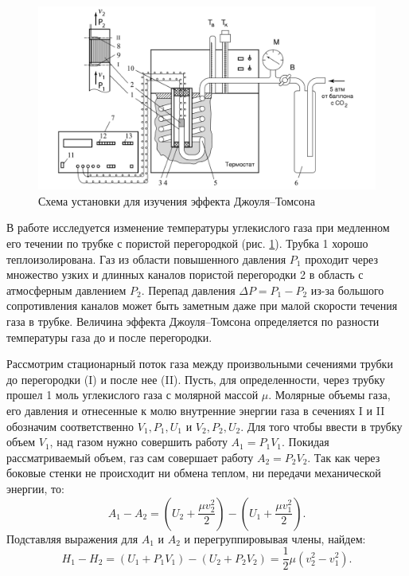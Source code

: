\documentclass[a4paper,12pt]{article}
\begin{document}
  \begin{figure}[h!]
    \centering
    \includegraphics[width=15cm]{apparatus.png}
    \caption{Схема установки для изучения эффекта Джоуля–Томсона}
    \label{fig:apparatus}
  \end{figure}

  В работе исследуется изменение температуры углекислого газа при медленном его течении по трубке с пористой перегородкой (рис. \ref{fig:apparatus}). Трубка 1 хорошо теплоизолирована. Газ из области повышенного давления $P_1$ проходит через множество узких и длинных каналов пористой перегородки 2 в область с атмосферным давлением $P_2$. Перепад давления $\Delta P = P_1 - P_2$ из-за большого сопротивления каналов может быть заметным даже при малой скорости течения газа в трубке. Величина эффекта Джоуля–Томсона определяется по разности температуры газа до и после перегородки.

  Рассмотрим стационарный поток газа между произвольными сечениями трубки до перегородки (I) и после нее (II). Пусть, для определенности, через трубку прошел 1 моль углекислого газа с молярной массой $\mu$. Молярные объемы газа, его давления и отнесенные к молю внутренние энергии газа в сечениях I и II обозначим соответственно $V_1, P_1, U_1$ и $V_2, P_2, U_2$. Для того чтобы ввести в трубку объем $V_1$, над газом нужно совершить работу $A_1 = P_1 V_1$. Покидая рассматриваемый объем, газ сам совершает работу $A_2 = P_2 V_2$. Так как через боковые стенки не происходит ни обмена теплом, ни передачи механической энергии, то:
  \begin{equation}
    A_1 - A_2 = \left(U_2 + \frac{\mu v_2^2}{2}\right) - \left(U_1 + \frac{\mu v_1^2}{2}\right).
  \end{equation}
  Подставляя выражения для $A_1$ и $A_2$ и перегруппировывая члены, найдем:
  \begin{equation}
  H_1 - H_2 = (U_1 + P_1V_1) - (U_2 + P_2V_2) = \frac{1}{2} \mu (v_2^2 - v_1^2).
  \end{equation}
\end{document}

